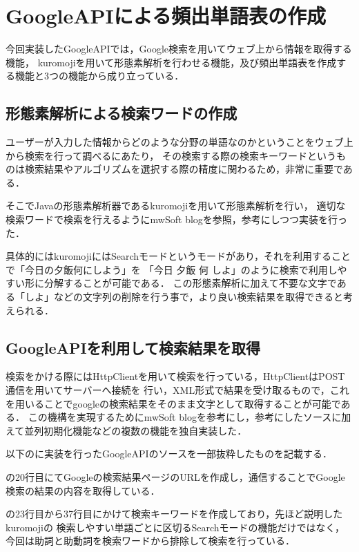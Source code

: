 \section{GoogleAPIによる頻出単語表の作成}
今回実装したGoogleAPIでは，Google検索を用いてウェブ上から情報を取得する機能，
kuromojiを用いて形態素解析を行わせる機能，及び頻出単語表を作成する機能と3つの機能から成り立っている．

\subsection{形態素解析による検索ワードの作成}
ユーザーが入力した情報からどのような分野の単語なのかということをウェブ上から検索を行って調べるにあたり，
その検索する際の検索キーワードというものは検索結果やアルゴリズムを選択する際の精度に関わるため，非常に重要である．

そこでJavaの形態素解析器であるkuromoji\cite{gitkuromoji}を用いて形態素解析を行い，
適切な検索ワードで検索を行えるようにmwSoft blog\cite{kuromoji}を参照，参考にしつつ実装を行った．

具体的にはkuromojiにはSearchモードというモードがあり，それを利用することで「今日の夕飯何にしよう」を
「今日 夕飯 何 しよ」のように検索で利用しやすい形に分解することが可能である．
この形態素解析に加えて不要な文字である「しよ」などの文字列の削除を行う事で，より良い検索結果を取得できると考えられる．

\subsection{GoogleAPIを利用して検索結果を取得}
検索をかける際にはHttpClientを用いて検索を行っている，HttpClientはPOST通信を用いてサーバーへ接続を
行い，XML形式で結果を受け取るもので，これを用いることでgoogleの検索結果をそのまま文字として取得することが可能である．
この機構を実現するためにmwSoft blog\cite{google}を参考にし，参考にしたソースに加えて並列初期化機能などの複数の機能を独自実装した．

以下のに実装を行ったGoogleAPIのソースを一部抜粋したものを記載する．

の20行目にてGoogleの検索結果ページのURLを作成し，通信することでGoogle検索の結果の内容を取得している．

の23行目から37行目にかけて検索キーワードを作成しており，先ほど説明したkuromojiの
検索しやすい単語ごとに区切るSearchモードの機能だけではなく，今回は助詞と助動詞を検索ワードから排除して検索を行っている．

